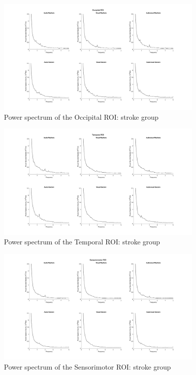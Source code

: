 \begin{figure}[htbp]
    \centering
    \includegraphics[width=0.9\textwidth]{stroke_images/occipital_roi.png}
    \caption{Power spectrum of the Occipital ROI: stroke group}
    \label{fig: Waveforms stroke: occipital} 
\end{figure}  
\begin{figure}[htbp]
    \centering
    \includegraphics[width=0.9\textwidth]{stroke_images/temporal_roi.png}
    \caption{Power spectrum of the Temporal ROI: stroke group}
    \label{fig: Waveforms stroke: temporal}   
\end{figure}
\begin{figure}[htbp]
    \centering
    \includegraphics[width= 0.9\textwidth]{stroke_images/sensorimotor_roi.png}
    \caption{Power spectrum of the Sensorimotor ROI: stroke group}
    \label{fig: Waveforms stroke: sensorimotor}   
\end{figure}

